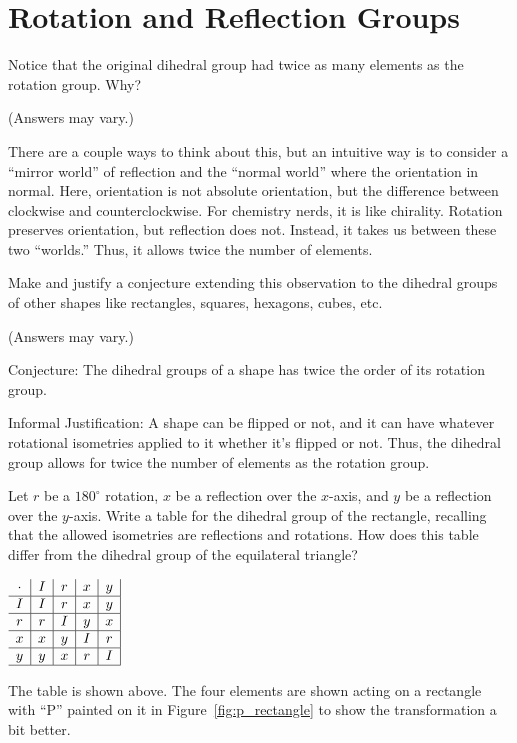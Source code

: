 \documentclass[../gatm_answers.tex]{subfiles}
\begin{document}
\section{Rotation and Reflection Groups}

\begin{outer_problem}[start=1]
\item Notice that the original dihedral group had twice as many elements as the rotation group. Why?
\end{outer_problem}

(Answers may vary.)

There are a couple ways to think about this, but an intuitive way is to consider a ``mirror world'' of reflection and the ``normal world'' where the orientation in normal. Here, orientation is not absolute orientation, but the difference between clockwise and counterclockwise. For chemistry nerds, it is like chirality. Rotation preserves orientation, but reflection does not. Instead, it takes us between these two ``worlds.'' Thus, it allows twice the number of elements.

\begin{outer_problem}
\item Make and justify a conjecture extending this observation to the dihedral groups of other shapes like rectangles, squares, hexagons, cubes, etc.
\end{outer_problem}

(Answers may vary.)

Conjecture: The dihedral groups of a shape has twice the order of its rotation group.

Informal Justification: A shape can be flipped or not, and it can have whatever rotational isometries applied to it whether it's flipped or not. Thus, the dihedral group allows for twice the number of elements as the rotation group.

\begin{outer_problem}
\item Let $r$ be a $180^{\circ}$ rotation, $x$ be a reflection over the $x$-axis, and $y$ be a reflection over the $y$-axis. Write a table for the dihedral group of the rectangle, recalling that the allowed isometries are reflections and rotations. How does this table differ from the dihedral group of the equilateral triangle?
\end{outer_problem}

\begin{center}
$\begin{array}{c|c|c|c|c|}
\cdot & I & r & x & y \\ \hline
I & I & r & x & y \\ \hline
r & r & I & y & x \\ \hline
x & x & y & I & r \\ \hline
y & y & x & r & I \\ \hline
\end{array}$
\end{center}
The table is shown above. The four elements are shown acting on a rectangle with ``P'' painted on it in Figure~\ref{fig:p_rectangle} to show the transformation a bit better.
\end{document}
